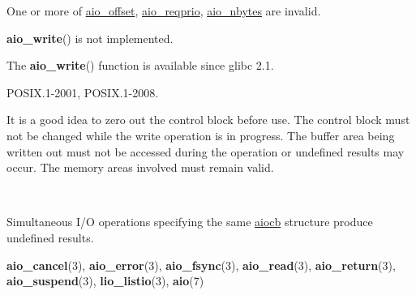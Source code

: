 \documentclass[]{article}
\let\realtextbf=\textbf
\renewcommand{\textbf}[1]{\textcolor{boldcolor}{\realtextbf{#1}}}
\renewcommand{\emph}[1]{\underline{#1}}
\begin{document}
\begin{description}
\itemsep1pt\parskip0pt
\item[\textbf{EINVAL}]
One or more of \emph{aio\_offset}, \emph{aio\_reqprio},
\emph{aio\_nbytes} are invalid.
\end{description}

\begin{description}
\itemsep1pt\parskip0pt
\item[\textbf{ENOSYS}]
\textbf{aio\_write}() is not implemented.
\end{description}


The \textbf{aio\_write}() function is available since glibc 2.1.


POSIX.1-2001, POSIX.1-2008.


It is a good idea to zero out the control block before use. The control
block must not be changed while the write operation is in progress. The
buffer area being written out must not be accessed during the operation
or undefined results may occur. The memory areas involved must remain
valid.

~

Simultaneous I/O operations specifying the same \emph{aiocb} structure
produce undefined results.


\textbf{aio\_cancel}(3), \textbf{aio\_error}(3), \textbf{aio\_fsync}(3),
\textbf{aio\_read}(3), \textbf{aio\_return}(3),
\textbf{aio\_suspend}(3), \textbf{lio\_listio}(3), \textbf{aio}(7)
\end{document}
